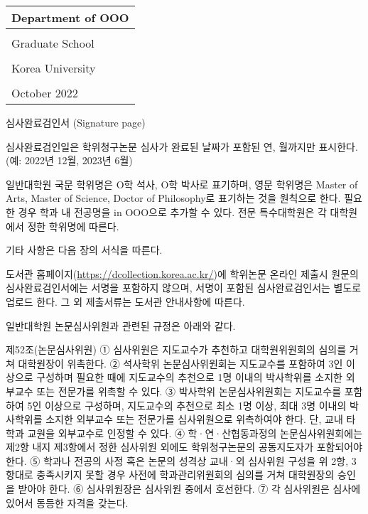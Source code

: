\documentclass[11pt]{report}
\numberwithin{figure}{chapter}
\theoremstyle{plain}
\theoremstyle{definition}
\theoremstyle{corollary}
\theoremstyle{definition}
\theoremstyle{plain}
\theoremstyle{definition}
\theoremstyle{plain}
\begin{document}
\noindent
\begin{tabularx}{\textwidth}{| >{\centering\arraybackslash}X |}
\arrayrulecolor{blue}
\hline
\Large Department of OOO \\\hline
\rule{0pt}{30pt}\\\hline
\LARGE Graduate School \\\hline
\\[-8pt]\hline
\LARGE Korea University \\\hline
\rule{0pt}{20pt}\\\hline
\large October 2022 \\\hline
\end{tabularx}

\newpage
\begin{center}
\large 심사완료검인서 (Signature page)
\end{center}

심사완료검인일은 학위청구논문 심사가 완료된 날짜가 포함된 연, 월까지만 표시한다.
(예: 2022년 12월, 2023년 6월)

일반대학원 국문 학위명은 O학 석사, O학 박사로 표기하며, 영문 학위명은 Master of Arts, Master of Science, Doctor of Philosophy로 표기하는 것을 원칙으로 한다.
필요한 경우 학과 내 전공명을 in OOO으로 추가할 수 있다.
전문 특수대학원은 각 대학원에서 정한 학위명에 따른다.

기타 사항은 다음 장의 서식을 따른다. 

도서관 홈페이지(\url{https://dcollection.korea.ac.kr/})에 학위논문 온라인 제출시 원문의 심사완료검인서에는 서명을 포함하지 않으며, 서명이 포함된 심사완료검인서는 별도로 업로드 한다.
그 외 제출서류는 도서관 안내사항에 따른다.

일반대학원 논문심사위원과 관련된 규정은 아래와 같다.

\bigskip

제52조(논문심사위원)
① 심사위원은 지도교수가 추천하고 대학원위원회의 심의를 거쳐 대학원장이 위촉한다.
② 석사학위 논문심사위원회는 지도교수를 포함하여 3인 이상으로 구성하며 필요한 때에 지도교수의 추천으로 1명 이내의 박사학위를 소지한 외부교수 또는 전문가를 위촉할 수 있다.
③ 박사학위 논문심사위원회는 지도교수를 포함하여 5인 이상으로 구성하며, 지도교수의 추천으로 최소 1명 이상, 최대 3명 이내의 박사학위를 소지한 외부교수 또는 전문가를 심사위원으로 위촉하여야 한다.
단, 교내 타학과 교원을 외부교수로 인정할 수 있다.
④ 학·연·산협동과정의 논문심사위원회에는 제2항 내지 제3항에서 정한 심사위원 외에도 학위청구논문의 공동지도자가 포함되어야 한다.
⑤ 학과나 전공의 사정 혹은 논문의 성격상 교내·외 심사위원 구성을 위 2항, 3항대로 충족시키지 못할 경우 사전에 학과관리위원회의 심의를 거쳐 대학원장의 승인을 받아야 한다.
⑥ 심사위원장은 심사위원 중에서 호선한다.
⑦ 각 심사위원은 심사에 있어서 동등한 자격을 갖는다.
\end{document}

